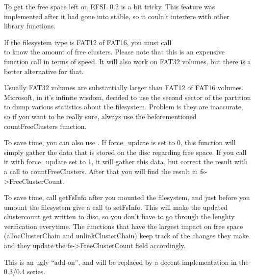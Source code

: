 
To get the free space left on EFSL 0.2 is a bit tricky. This
feature was implemented after it had gone into stable, so it
couln't interfere with other library functions.

If the filesystem type is FAT12 of FAT16, you must call\\
 to know
the amount of free clusters. Please note that this is an expensive
function call in terms of speed. It will also work on FAT32 volumes,
but there is a better alternative for that.

Usually FAT32 volumes are substantially larger than FAT12 of FAT16 volumes.
Microsoft, in it's infinite wisdom, decided to use the second sector of
the partition to dump various statistics about the filesystem. Problem
is they are inaccurate, so if you want to be really sure, always use the
beforementioned countFreeClusters function.

To save time, you can also use .
If force\_update is set to 0, this function will simply gather the data
that is stored on the disc regarding free space. If you call it with
force\_update set to 1, it will gather this data, but correct the result
with a call to countFreeClusters.
After that you will find the result in fs->FreeClusterCount.

To save time, call getFsInfo after you mounted the filesystem,
and just before you umount the filesystem give a call to setFsInfo.
This will make the updated clustercount get written to disc, so you
don't have to go through the lenghty verification everytime.
The functions that have the largest impact on free space (allocClusterChain
and unlinkClusterChain) keep track of the changes they make and they update
the fs->FreeClusterCount field accordingly.

This is an ugly ``add-on'', and will be replaced by a decent implementation
in the 0.3/0.4 series.
